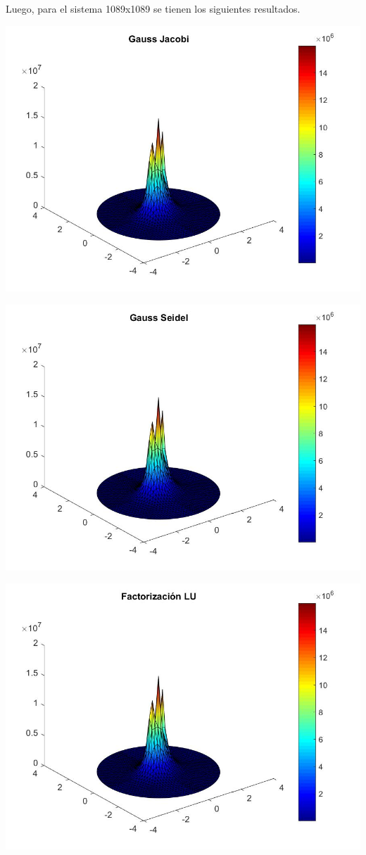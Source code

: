 \documentclass{memoria}
\begin{document}
Luego, para el sistema 1089x1089 se tienen los siguientes resultados.


{\includegraphics[width=16cm]{imagenes/SE/Resultados1089_GJ.jpg}}

{\includegraphics[width=16cm]{imagenes/SE/Resultados1089_GS.jpg}}

{\includegraphics[width=16cm]{imagenes/SE/Resultados1089_LU.jpg}}
\end{document}
